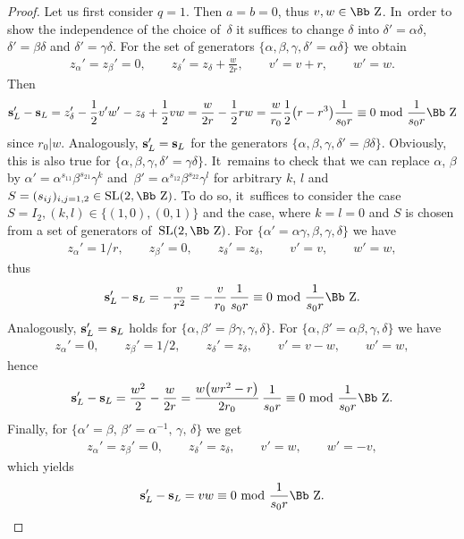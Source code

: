 \documentclass[10pt,a4paper]{amsart}
\newcommand\ZZ{{\mbox{\Bb Z}}}
\newcommand\bs{\textbf{{\rm \textbf{s}}}}
\newcommand{\SL}{\mathop{{\rm SL}}}
\numberwithin{equation}{section}
\begin{document}
\begin{proof}
Let us first consider $q=1$. Then $a=b=0$, thus $v,w\in\ZZ$. In~order to show the independence of the choice of~$\delta$ it suffices to change $\delta$ into $\delta'=\alpha\delta$, $\delta'=\beta\delta$ and $\delta'=\gamma\delta$. For the set of generators $\{\alpha,\beta,\gamma,\delta'=\alpha\delta\}$ we obtain
\begin{gather}\label{ad}
 z_\alpha'= z_\beta'=0,\qquad z_\delta'= z_\delta+\frac w{2r},\qquad v'=v+r,\qquad w'=w.
\end{gather}
Then
\begin{gather*}
\bs_L'-\bs_L =z_\delta'-\frac{1}{2}v'w'-z_\delta+\frac{1}{2}vw=\frac w{2r}-\frac12 rw=\frac w{r_0} \frac12 \big(r-r^3\big) \frac1{s_0r}\equiv 0\ {\rm mod}\ \frac{1}{s_0r}\ZZ
\end{gather*}
since $r_0|w$. Analogously, $\bs_L'=\bs_L$ for the generators $\{\alpha,\beta,\gamma,\delta'=\beta\delta\}$. Obviously, this is also true for $\{\alpha,\beta,\gamma,\delta'=\gamma\delta\}$. It~remains to check that we can replace $\alpha$, $\beta$ by $\alpha'=\alpha^{s_{11}}\beta^{s_{21}}\gamma^k$ and~$\beta'=\alpha^{s_{12}}\beta^{s_{22}}\gamma^l$ for arbitrary $k$, $l$ and $S=(s_{ij})_{i,j=1,2}\in\SL(2,\ZZ)$. To do so, it~suffices to consider the case $S=I_2, (k,l)\in\{(1,0),(0,1)\}$ and the case, where $k=l=0$ and $S$ is chosen from a set of generators of~$\SL(2,\ZZ)$. For $\{\alpha'=\alpha\gamma,\beta,\gamma,\delta\}$ we have
\begin{gather*}
z_\alpha'= 1/r,\qquad z_\beta'=0,\qquad z_\delta'= z_\delta,\qquad v'=v,\qquad w'=w,
\end{gather*}
thus
\begin{gather*}
\bs_L'-\bs_L = -\frac v{r^2}=-\frac v{r_0}\, \frac 1{s_0r} \equiv 0\ {\rm mod}\ \frac{1}{s_0r}\ZZ.
\end{gather*}
Analogously, $\bs_L'=\bs_L$ holds for $\{\alpha,\beta'=\beta\gamma,\gamma,\delta\}$. For $\{\alpha,\beta'=\alpha\beta,\gamma,\delta\}$
we have
\begin{gather*}
z_\alpha'= 0,\qquad z_\beta'=1/2,\qquad z_\delta'= z_\delta,\qquad v'=v-w,\qquad w'=w,
\end{gather*}
hence
\begin{gather*}
\bs_L'-\bs_L = \frac {w^2}{2}-\frac w{2r}= \frac{w\big(wr^2-r\big)}{2r_0}\,\frac 1{s_0r} \equiv 0\ {\rm mod}\ \frac{1}{s_0r}\ZZ.
\end{gather*}
Finally, for $\big\{\alpha'=\beta,\,\beta'=\alpha^{-1},\,\gamma,\,\delta\big\}$ we get
\begin{gather*}
 z_\alpha'= z_\beta'=0,\qquad z_\delta'= z_\delta,\qquad v'=w,\qquad w'=-v,
 \end{gather*}
which yields
\begin{gather*}
 \bs_L'-\bs_L = vw \equiv 0\ {\rm mod}\ \frac{1}{s_0r}\ZZ.
 \end{gather*}



\end{proof}
\end{document}
